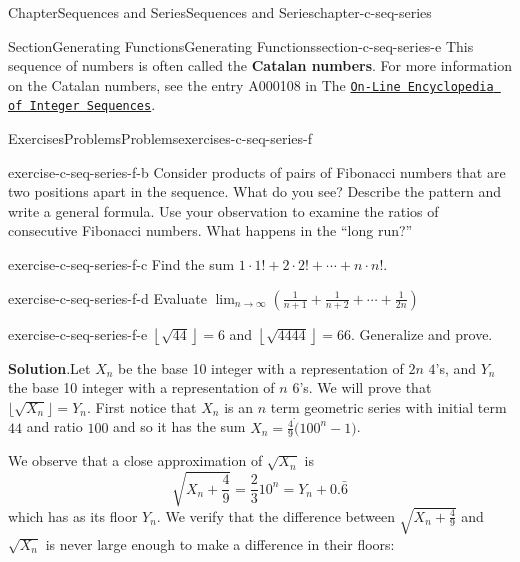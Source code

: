 \documentclass[oneside,10pt,]{book}
\newcommand{\blocktitlefont}{\relax}
\newcommand{\terminology}[1]{\textbf{#1}}
\numberwithin{equation}{section}
\begin{document}
\begin{chapterptx}{Chapter}{Sequences and Series}{}{Sequences and Series}{}{}{chapter-c-seq-series}
\begin{sectionptx}{Section}{Generating Functions}{}{Generating Functions}{}{}{section-c-seq-series-e}
This sequence of numbers is often called the \terminology{Catalan numbers}. For more information on the Catalan numbers, see the entry A000108 in The \href{https://oeis.org}{\nolinkurl{On-Line Encyclopedia of Integer Sequences}}.%
\end{sectionptx}
%
%
\typeout{************************************************}
\typeout{************************************************}
%
\begin{exercises-section}{Exercises}{Problems}{}{Problems}{}{}{exercises-c-seq-series-f}
\begin{divisionexercise}{1}{}{}{exercise-c-seq-series-f-b}%
Consider products of pairs of Fibonacci numbers that are two positions apart in the sequence.  What do you see?  Describe the pattern and write a general formula.  Use your observation to examine the ratios of consecutive Fibonacci numbers.   What happens in the  ``long run?''%
\end{divisionexercise}%
\begin{divisionexercise}{2}{}{}{exercise-c-seq-series-f-c}%
Find the sum  \(1\cdot 1! + 2\cdot 2! + \cdots +n\cdot n!\).%
\end{divisionexercise}%
\begin{divisionexercise}{3}{}{}{exercise-c-seq-series-f-d}%
Evaluate  \(\lim_{n\to \infty }  \left(\frac{1}{n+1}+ \frac{1}{n+2}+ \cdots +\frac{1}{2n}\right)\)%
\end{divisionexercise}%
\begin{divisionexercise}{4}{}{}{exercise-c-seq-series-f-e}%
\(\left\lfloor \sqrt{44}\right\rfloor =6\) and   \(\left\lfloor \sqrt{4444}\right\rfloor =66\).  Generalize and prove.%
\par\smallskip%
\noindent\textbf{\blocktitlefont Solution}.\hypertarget{solution-c-seq-series-f-e-b}{}\quad{}Let \(X_n\) be the base 10 integer with a representation of \(2n\) \(4\)'s, and \(Y_n\) the base 10 integer with a representation of \(n\) \(6\)'s.  We will prove that \(\lfloor \sqrt{X_n} \rfloor = Y_n\).  First notice that \(X_n\) is an \(n\) term geometric series with initial term \(44\) and ratio \(100\) and so it has the sum \(X_n = \frac{4}{9} \dot (100^n-1)\).%
\par
We observe that a close approximation of \(\sqrt{X_n}\) is%
\begin{equation*}
\sqrt{X_n + \frac{4}{9}} = \frac{2}{3} 10^n = Y_n +0.\bar{6}
\end{equation*}
which has as its floor \(Y_n\).  We verify that the difference between \(\sqrt{X_n + \frac{4}{9}}\) and \(\sqrt{X_n}\) is never large enough to make a difference in their floors:%

\end{divisionexercise}
\end{exercises-section}
\end{chapterptx}
\end{document}
